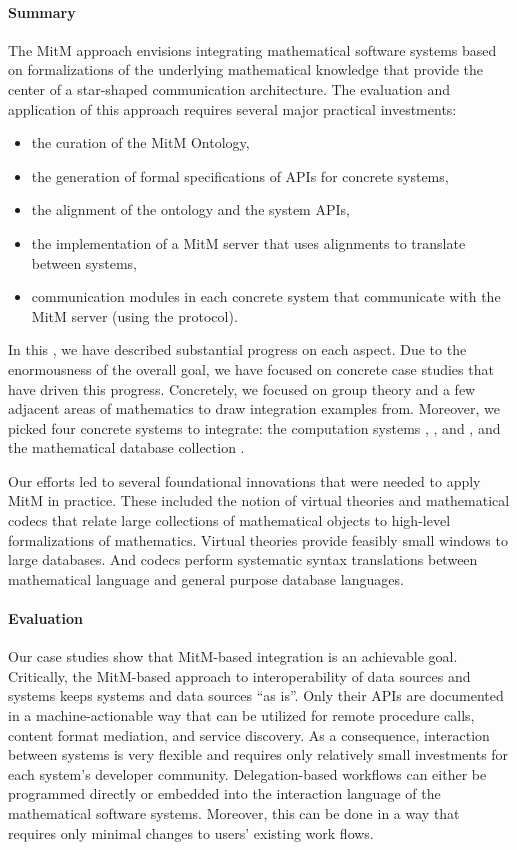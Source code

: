 \paragraph{Summary}
The MitM approach envisions integrating mathematical software systems based on formalizations of the underlying mathematical knowledge that provide the center of a star-shaped communication architecture.
The evaluation and application of this approach requires several major practical investments:
\begin{itemize}
\item the curation of the MitM Ontology,
\item the generation of formal specifications of APIs for concrete systems,
\item the alignment of the ontology and the system APIs,
\item the implementation of a MitM server that uses alignments to translate between systems,
\item communication modules in each concrete system that communicate with the MitM server (using the \SCSCP protocol).
\end{itemize}

In this \papertype, we have described substantial progress on each aspect.
Due to the enormousness of the overall goal, we have focused on concrete case studies that have driven this progress.
Concretely, we focused on group theory and a few adjacent areas of mathematics to draw integration examples from.
Moreover, we picked four concrete systems to integrate: the computation systems \Sage, \GAP, and \Singular, and the mathematical database collection \lmfdb.

Our efforts led to several foundational innovations that were needed to apply MitM in practice.
These included the notion of virtual theories and mathematical codecs that relate large collections of mathematical objects to high-level formalizations of mathematics.
Virtual theories provide feasibly small windows to large databases.
And codecs perform systematic syntax translations between mathematical language and general purpose database languages.

\paragraph{Evaluation}
Our case studies show that MitM-based integration is an achievable goal.
Critically, the MitM-based approach to interoperability of data sources and systems keeps systems and data sources ``as is''.
Only their APIs are documented in a machine-actionable way that can be utilized for remote procedure calls, content format mediation, and service discovery.
As a consequence, interaction between systems is very flexible and requires only relatively small investments for each system's developer community.
Delegation-based workflows can either be programmed directly or embedded into the interaction language of the mathematical software systems.
Moreover, this can be done in a way that requires only minimal changes to users' existing work flows.


